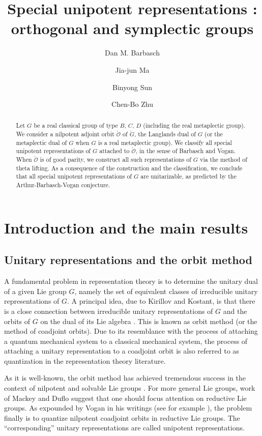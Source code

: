 \documentclass[12pt,a4paper]{amsart}
\title[]{Special unipotent representations : orthogonal and symplectic groups}
\author [D. Barbasch] {Dan M. Barbasch}
\author [J.-J. Ma] {Jia-jun Ma}
\author [B. Sun] {Binyong Sun}
\author [C.-B. Zhu] {Chen-Bo Zhu}
\newcommand{\CO}{{\mathcal {O}}}
\numberwithin{equation}{section}
\theoremstyle{remark}
\begin{document}

\begin{abstract} Let $G$ be a real classical group of type $B$, $C$, $D$ (including the real metaplectic group). We consider a nilpotent adjoint orbit $\check \CO$ of $\check G$, the Langlands dual of $G$ (or the metaplectic dual of $G$ when $G$ is a real metaplectic group). We classify all special unipotent representations of $G$ attached to $\check \CO$, in the sense of Barbasch and Vogan. When $\check \CO$ is of good parity, we construct all such representations of $G$ via the method of theta lifting. As a consequence of the construction and the classification, we conclude that all special unipotent representations of $G$ are unitarizable, as predicted by the Arthur-Barbasch-Vogan conjecture.
\end{abstract}



\maketitle


\tableofcontents


\section{Introduction and the main results}\label{sec:intro}


\subsection{Unitary representations and the orbit method}
A fundamental problem in representation theory is to determine the unitary dual
of a given Lie group $G$, namely the set of equivalent classes of irreducible
unitary representations of $G$. A principal idea, due to Kirillov and Kostant,
is that there is a close connection between irreducible unitary representations
of $G$ and the orbits of $G$ on the dual of its Lie algebra \cite{Ki62,Ko70}.
This is known as orbit method (or the method of coadjoint orbits). Due to its
resemblance with the process of attaching a quantum mechanical system to a
classical mechanical system, the process of attaching a unitary representation
to a coadjoint orbit is also referred to as quantization in the representation
theory literature.

As it is well-known, the orbit method has achieved tremendous success in the
context of nilpotent and solvable Lie groups \cite{Ki62,AK}. For more general
Lie groups, work of Mackey and Duflo \cite{Ma,Du82} suggest that one should
focus attention on reductive Lie groups. As expounded by Vogan in his writings
(see for example \cite{VoBook,Vo98,Vo00}), the problem finally is to quantize
nilpotent coadjoint orbits in reductive Lie groups. The ``corresponding''
unitary representations are called unipotent representations.
\end{document}
